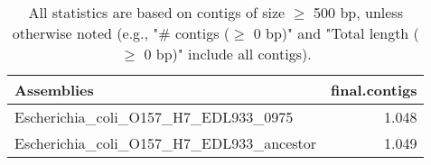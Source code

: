 \documentclass[12pt,a4paper]{article}
\begin{document}
\begin{table}[ht]
\begin{center}
\caption{All statistics are based on contigs of size $\geq$ 500 bp, unless otherwise noted (e.g., "\# contigs ($\geq$ 0 bp)" and "Total length ($\geq$ 0 bp)" include all contigs).}
\begin{tabular}{|l*{1}{|r}|}
\hline
Assemblies & final.contigs \\ \hline
Escherichia\_coli\_O157\_H7\_EDL933\_0975 & 1.048 \\ \hline
Escherichia\_coli\_O157\_H7\_EDL933\_ancestor & 1.049 \\ \hline
\end{tabular}
\end{center}
\end{table}
\end{document}
